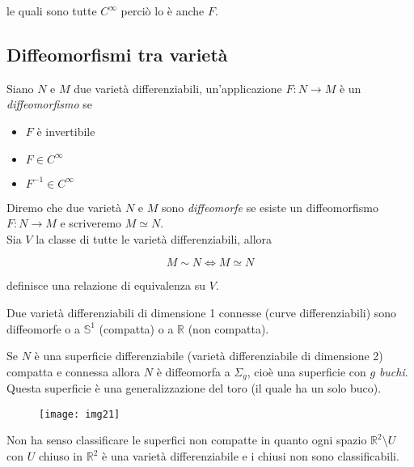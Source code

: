 le quali sono tutte $ C^{\infty} $ perciò lo è anche $ F $.

\subsection{Diffeomorfismi tra varietà}

Siano $ N $ e $ M $ due varietà differenziabili, un'applicazione $ F : N \to M $ è un \textit{diffeomorfismo} se

\begin{itemize}
	\item $ F $ è invertibile
	
	\item $ F \in C^{\infty} $
	
	\item $ F^{-1} \in C^{\infty} $
\end{itemize}

Diremo che due varietà $ N $ e $ M $ sono \textit{diffeomorfe} se esiste un diffeomorfismo $ F : N \to M $ e scriveremo $ M \simeq N $.\\
Sia $ V $ la classe di tutte le varietà differenziabili, allora

\begin{equation}
	M \sim N \iff M \simeq N
\end{equation}

definisce una relazione di equivalenza su $ V $.

\begin{theorem}
	Due varietà differenziabili di dimensione 1 connesse (curve differenziabili) sono diffeomorfe o a $ \mathbb{S}^{1} $ (compatta) o a $ \mathbb{R} $ (non compatta).
\end{theorem}

\begin{theorem}
	Se $ N $ è una superficie differenziabile (varietà differenziabile di dimensione 2) compatta e connessa allora $ N $ è diffeomorfa a $ \Sigma_{g} $, cioè una superficie con $ g $ \textit{buchi}. Questa superficie è una generalizzazione del toro (il quale ha un solo buco).
	
	\begin{figure}[H]
		\centering
		\texttt{[image: img21]}
	\end{figure}
\end{theorem}

\begin{remark}
	Non ha senso classificare le superfici non compatte in quanto ogni spazio $ \mathbb{R}^{2} \setminus U $ con $ U $ chiuso in $ \mathbb{R}^{2} $ è una varietà differenziabile e i chiusi non sono classificabili.
\end{remark}

